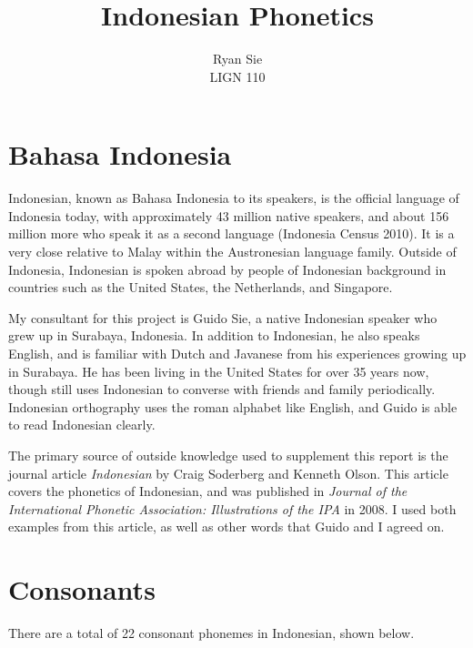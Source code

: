 \documentclass[a4paper, 12pt]{article}
\title{Indonesian Phonetics}
\date{}
\author{Ryan Sie \\ LIGN 110}
\begin{document}
\maketitle


\section{Bahasa Indonesia}

Indonesian, known as Bahasa Indonesia to its speakers, is the official language of Indonesia today, with approximately 43 million native speakers, and about 156 million more who speak it as a second language (Indonesia Census 2010). It is a very close relative to Malay within the Austronesian language family. Outside of Indonesia, Indonesian is spoken abroad by people of Indonesian background in countries such as the United States, the Netherlands, and Singapore.
\bigskip

My consultant for this project is Guido Sie, a native Indonesian speaker who grew up in Surabaya, Indonesia. In addition to Indonesian, he also speaks English, and is familiar with Dutch and Javanese from his experiences growing up in Surabaya. He has been living in the United States for over 35 years now, though still uses Indonesian to converse with friends and family periodically. Indonesian orthography uses the roman alphabet like English, and Guido is able to read Indonesian clearly. 
\bigskip

The primary source of outside knowledge used to supplement this report is the journal article \textit{Indonesian} by Craig Soderberg and Kenneth Olson. This article covers the phonetics of Indonesian, and was published in \textit{Journal of the International Phonetic Association: Illustrations of the IPA} in 2008. I used both examples from this article, as well as other words that Guido and I agreed on.

\section{Consonants}

There are a total of 22 consonant phonemes in Indonesian, shown below. 
\end{document}
